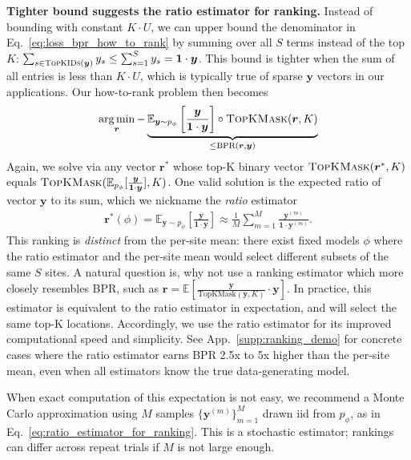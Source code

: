 \textbf{Tighter bound suggests the ratio estimator for ranking.} 
Instead of bounding with constant $K \cdot U$, we can upper bound the denominator in Eq.~\eqref{eq:loss_bpr_how_to_rank} by summing over all $S$ terms instead of the top $K$:
$\sum_{s \in \textsc{TopKIDs}(\bm{y})} y_s \leq \sum_{s=1}^S y_s = \bm{1} \cdot \bm{y}$. This bound is tighter when the sum of all entries is less than $K \cdot U$, which is typically true of sparse $\bm{y}$ vectors in our applications. Our how-to-rank problem then becomes
\begin{align}
    \operatorname*{arg\,min}_{\bm{r}} - \underbrace{
    \mathbb{E}_{\bm{y} \sim p_{\phi}} \left[
    \frac{
    \bm{y} 
    }{
        \bm{1} \cdot \bm{y}
    }
    \right] \circ \textsc{TopKMask}( \bm{r}, K)
    }_{\leq \text{BPR}(\bm{r}, \bm{y})}
\end{align}
Again, we solve via any vector $\bm{r}^*$ whose top-K binary vector
$ \textsc{TopKMask}(\bm{r}^*, K)$ equals $\textsc{TopKMask}( \mathbb{E}_{p_{\phi}} [
    \frac{ \bm{y} }{\bm{1} \cdot \bm{y}}
    ], K )$.    
One valid solution is the expected ratio of vector $\bm{y}$ to its sum, which we nickname the \emph{ratio} estimator
\begin{align}
\label{eq:ratio_estimator_for_ranking}
\bm{r}^*(\phi) = \mathbb{E}_{\bm{y} \sim p_{\phi}}\left[ \frac{\bm{y}}{\bm{1} \cdot \bm{y}} \right]
\approx \frac{1}{M} \sum_{m=1}^M \frac{ \bm{y}^{(m)}}{ \bm{1}\cdot\bm{y}^{(m)} }.
\end{align}
This ranking is \emph{distinct} from the per-site mean: there exist fixed models $\phi$ where the ratio estimator and the per-site mean would select different subsets of the same $S$ sites.
A natural question is, why not use a ranking estimator which more closely resembles BPR, such as $\bm{r} = \mathbb{E}[ \frac{ \bm{y} }{ \text{TopKMask}(\bm{y},K)} \cdot \bm{y}  ]$. 
In practice, this estimator is equivalent to the ratio estimator in expectation, and will select the same top-K locations. Accordingly, we use the ratio estimator for its improved computational speed and simplicity.
See App.~\ref{supp:ranking_demo} for concrete cases where the ratio estimator earns BPR 2.5x to 5x higher than the per-site mean, even when all estimators know the true data-generating model.

When exact computation of this expectation is not easy, we recommend a Monte Carlo approximation using $M$ samples $\{ \bm{y}^{(m)} \}_{m=1}^M$ drawn iid from $p_{\phi}$, as in Eq.~\eqref{eq:ratio_estimator_for_ranking}. 
This is a stochastic estimator; rankings can differ across repeat trials if $M$ is not large enough.

